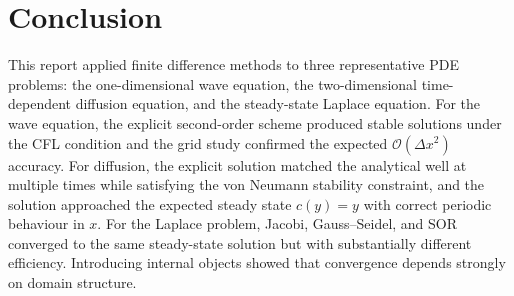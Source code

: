 \documentclass[10pt, journal]{IEEEtran}
\begin{document}
\section{Conclusion}
This report applied finite difference methods to three representative PDE problems: the one-dimensional wave equation, the two-dimensional time-dependent diffusion equation, and the steady-state Laplace equation. For the wave equation, the explicit second-order scheme produced stable solutions under the CFL condition and the grid study confirmed the expected $\mathcal{O}(\Delta x^2)$ accuracy. For diffusion, the explicit solution matched the analytical well at multiple times while satisfying the von Neumann stability constraint, and the solution approached the expected steady state $c(y)=y$ with correct periodic behaviour in $x$.
For the Laplace problem, Jacobi, Gauss--Seidel, and SOR converged to the same steady-state solution but with substantially different efficiency.  Introducing internal objects showed that convergence depends strongly on domain structure.
\end{document}
